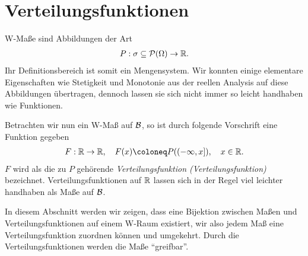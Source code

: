 \clearpage
\section{Verteilungsfunktionen}
\label{chap:1.c}


W-Maße sind Abbildungen der Art
\begin{align*}
P : \sigma\subseteq \mathcal{P}(\Omega) \to \mathbb{R}.
\end{align*}
Ihr Definitionsbereich ist somit ein Mengensystem. Wir konnten einige
elementare Eigenschaften wie Stetigkeit und Monotonie aus der reellen Analysis
auf diese Abbildungen übertragen, dennoch lassen sie sich nicht immer so leicht
handhaben wie Funktionen.

Betrachten wir nun ein W-Maß auf $\mathcal{B}$, so ist durch folgende Vorschrift eine
Funktion gegeben
\begin{align*}
F: \R\to\R,\quad F(x) \defl P((-\infty,x]),\quad x\in\R.
\end{align*}
$F$ wird als die zu $P$ gehörende \emph{Verteilungsfunktion (Verteilungsfunktion)} bezeichnet.
Verteilungsfunktionen auf $\mathbb{R}$ lassen sich in der Regel viel leichter handhaben
als Maße auf $\mathcal{B}$.

In diesem Abschnitt werden wir zeigen, dass eine Bijektion zwischen Maßen und
Verteilungsfunktionen auf einem W-Raum existiert, wir also jedem Maß eine
Verteilungsfunktion zuordnen können und umgekehrt. Durch die
Verteilungsfunktionen werden die Maße ``greifbar''.

\clearpage

